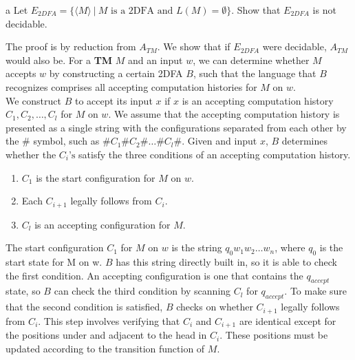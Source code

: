 \documentclass[11pt]{article}
\begin{document}
\begin{problem}[Part]{a}
Let $E_{2DFA} = \{\langle M \rangle \ | \ M \text{ is a 2DFA and } L(M) = \emptyset   \}$. Show that $E_{2DFA}$ is not decidable.
\end{problem}

\begin{idea}
The proof is by reduction from $A_{TM}$. We show that if $E_{2DFA}$
were decidable, $A_{TM}$ would also be. For a \textbf{TM} $M$ and an input $w$, we can determine whether $M$ accepts $w$ by constructing a certain 2DFA $B$, such that the language that $B$ recognizes comprises all accepting computation histories for $M$ on $w$. \\

We construct $B$ to accept its input $x$ if $x$ is an accepting computation history $C_1,C_2,\dots,C_l$ for $M$ on $w$. We assume that the accepting computation history is presented as a single string with the configurations separated from each other by the \# symbol, such as $\#C_1\#C_2\#\dots\#C_l\#$. Given and input $x$, $B$ determines
whether the $C_i\text{'s}$ satisfy the three conditions of an accepting computation history.
\begin{enumerate}
\item $C_1$ is the start configuration for $M$ on $w$.
\item Each $C_{i+1}$ legally follows from $C_i$.
\item $C_l$ is an accepting configuration for $M$.
\end{enumerate}
The start configuration $C_1$ for $M$ on $w$ is the string $q_0w_1w_2 \dots w_n$, where $q_0$ is the start state for M on w. $B$ has this string directly built in, so it is able to check the first condition. An accepting configuration is one that contains the $q_{accept}$ state, so $B$ can check the third condition by scanning $C_l$ for $q_{accept}$. To make sure that the second condition is satisfied, $B$ checks on whether $C_{i+1}$ legally follows from $C_i$. This step involves verifying that $C_i$ and $C_{i+1}$ are identical except for the positions under and adjacent to the head in $C_i$. These positions must be updated according to the transition function of $M$.
\end{idea}
\end{document}
